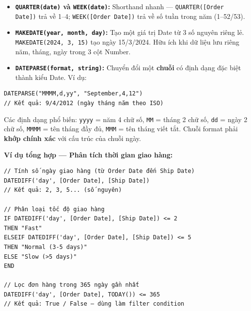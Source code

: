 \documentclass[12pt]{article}
\begin{document}
\begin{itemize}
    \item \textbf{\texttt{QUARTER(date)} và \texttt{WEEK(date)}:} Shorthand nhanh --- \texttt{QUARTER([Order Date])} trả về 1--4; \texttt{WEEK([Order Date])} trả về số tuần trong năm (1--52/53).

    \item \textbf{\texttt{MAKEDATE(year, month, day)}:} Tạo một giá trị Date từ 3 số nguyên riêng lẻ. \texttt{MAKEDATE(2024, 3, 15)} tạo ngày 15/3/2024. Hữu ích khi dữ liệu lưu riêng năm, tháng, ngày trong 3 cột Number.

    \item \textbf{\texttt{DATEPARSE(format, string)}:} Chuyển đổi một \textbf{chuỗi} có định dạng đặc biệt thành kiểu Date. Ví dụ:
\end{itemize}

\begin{aivncodebox}[]
\begin{lstlisting}
DATEPARSE("MMMM,d,yy", "September,4,12")
// Kết quả: 9/4/2012 (ngày tháng năm theo ISO)
\end{lstlisting}
\end{aivncodebox}

\noindent Các định dạng phổ biến: \texttt{yyyy} = năm 4 chữ số, \texttt{MM} = tháng 2 chữ số, \texttt{dd} = ngày 2 chữ số, \texttt{MMMM} = tên tháng đầy đủ, \texttt{MMM} = tên tháng viết tắt. Chuỗi format phải \textbf{khớp chính xác} với cấu trúc của chuỗi ngày.

\noindent \textbf{Ví dụ tổng hợp --- Phân tích thời gian giao hàng:}

\begin{aivncodebox}[]
\begin{lstlisting}
// Tính số ngày giao hàng (từ Order Date đến Ship Date)
DATEDIFF('day', [Order Date], [Ship Date])
// Kết quả: 2, 3, 5... (số nguyên)

// Phân loại tốc độ giao hàng
IF DATEDIFF('day', [Order Date], [Ship Date]) <= 2
THEN "Fast"
ELSEIF DATEDIFF('day', [Order Date], [Ship Date]) <= 5
THEN "Normal (3-5 days)"
ELSE "Slow (>5 days)"
END

// Lọc đơn hàng trong 365 ngày gần nhất
DATEDIFF('day', [Order Date], TODAY()) <= 365
// Kết quả: True / False — dùng làm filter condition
\end{lstlisting}
\end{aivncodebox}
\end{document}
